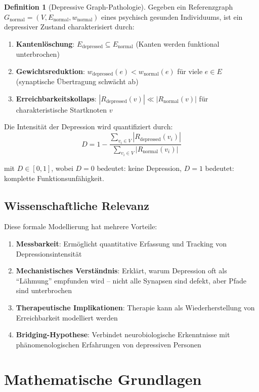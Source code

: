 \documentclass[a4paper,12pt]{article}
\theoremstyle{definition}
\newtheorem{definition}{Definition}
\begin{document}
\begin{definition}[Depressive Graph-Pathologie]
Gegeben ein Referenzgraph $G_{\text{normal}} = (V, E_{\text{normal}}, w_{\text{normal}})$ eines psychisch gesunden Individuums, ist ein depressiver Zustand charakterisiert durch:

\begin{enumerate}
	\item \textbf{Kantenlöschung}: $E_{\text{depressed}} \subseteq E_{\text{normal}}$ (Kanten werden funktional unterbrochen)
	\item \textbf{Gewichtsreduktion}: $w_{\text{depressed}}(e) < w_{\text{normal}}(e)$ für viele $e \in E$ (synaptische Übertragung schwächt ab)
	\item \textbf{Erreichbarkeitskollaps}: $|R_{\text{depressed}}(v)| \ll |R_{\text{normal}}(v)|$ für charakteristische Startknoten $v$
\end{enumerate}

Die Intensität der Depression wird quantifiziert durch:
\[
D = 1 - \frac{\sum_{v_i \in V} |R_{\text{depressed}}(v_i)|}{\sum_{v_i \in V} |R_{\text{normal}}(v_i)|}
\]

mit $D \in [0, 1]$, wobei $D = 0$ bedeutet: keine Depression, $D = 1$ bedeutet: komplette Funktionsunfähigkeit.
\end{definition}

\subsection{Wissenschaftliche Relevanz}

Diese formale Modellierung hat mehrere Vorteile:

\begin{enumerate}
	\item \textbf{Messbarkeit}: Ermöglicht quantitative Erfassung und Tracking von Depressionsintensität
	\item \textbf{Mechanistisches Verständnis}: Erklärt, warum Depression oft als ``Lähmung'' empfunden wird -- nicht alle Synapsen sind defekt, aber Pfade sind unterbrochen
	\item \textbf{Therapeutische Implikationen}: Therapie kann als Wiederherstellung von Erreichbarkeit modelliert werden
	\item \textbf{Bridging-Hypothese}: Verbindet neurobiologische Erkenntnisse mit phänomenologischen Erfahrungen von depressiven Personen
\end{enumerate}

\section{Mathematische Grundlagen}
\end{document}
